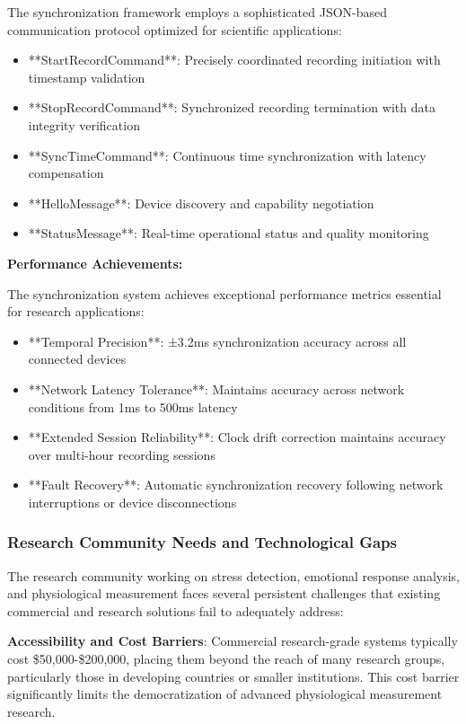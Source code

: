 \documentclass[11pt,a4paper]{report}
\begin{document}
The synchronization framework employs a sophisticated JSON-based communication protocol optimized for scientific
applications:

\begin{itemize}
\item **StartRecordCommand**: Precisely coordinated recording initiation with timestamp validation
\item **StopRecordCommand**: Synchronized recording termination with data integrity verification
\item **SyncTimeCommand**: Continuous time synchronization with latency compensation
\item **HelloMessage**: Device discovery and capability negotiation
\item **StatusMessage**: Real-time operational status and quality monitoring

\end{itemize}
\textbf{Performance Achievements:}

The synchronization system achieves exceptional performance metrics essential for research applications:

\begin{itemize}
\item **Temporal Precision**: ±3.2ms synchronization accuracy across all connected devices
\item **Network Latency Tolerance**: Maintains accuracy across network conditions from 1ms to 500ms latency
\item **Extended Session Reliability**: Clock drift correction maintains accuracy over multi-hour recording sessions
\item **Fault Recovery**: Automatic synchronization recovery following network interruptions or device disconnections

\end{itemize}
\subsubsection{Research Community Needs and Technological Gaps}

The research community working on stress detection, emotional response analysis, and physiological measurement faces
several persistent challenges that existing commercial and research solutions fail to adequately address:

\textbf{Accessibility and Cost Barriers}: Commercial research-grade systems typically cost \$50,000-\$200,000, placing them
beyond the reach of many research groups, particularly those in developing countries or smaller institutions. This cost
barrier significantly limits the democratization of advanced physiological measurement research.
\end{document}
